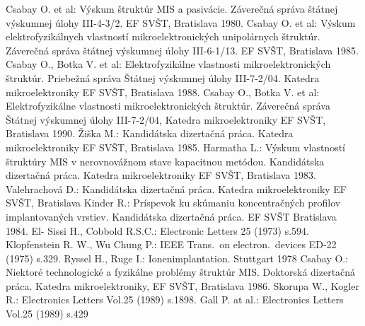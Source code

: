 \begin{thebibliography}{}
 Csabay O. et al: Výskum štruktúr MIS a
  pasivácie. Záverečná správa štátnej výskumnej úlohy III-4-3/2. EF
  SVŠT, Bratislava 1980.
 Csabay O. et al: Výskum elektrofyzikálnych
  vlastností mikroelektronických unipolárnych štruktúr. Záverečná
  správa štátnej výskumnej úlohy III-6-1/13. EF SVŠT, Bratislava 1985.
 Csabay O., Botka V. et al: Elektrofyzikálne
  vlastnosti mikroelektronických štruktúr. Priebežná správa Štátnej
  výskumnej úlohy III-7-2/04. Katedra mikroelektroniky EF SVŠT,
  Bratislava 1988.
 Csabay O., Botka V. et al: Elektrofyzikálne
  vlastnosti mikroelektronických štruktúr. Záverečná správa Štátnej
  výskumnej úlohy III-7-2/04, Katedra mikroelektroniky EF SVŠT,
  Bratislava 1990.
 Žiška M.: Kandidátska dizertačná práca. Katedra
  mikroelektroniky EF SVŠT, Bratislava 1985.
 Harmatha L.: Výskum vlastností štruktúry MIS v
  nerovnovážnom stave kapacitnou metódou. Kandidátska dizertačná
  práca. Katedra mikroelektroniky EF SVŠT, Bratislava 1983.
 Valehrachová D.: Kandidátska dizertačná
  práca. Katedra mikroelektroniky EF SVŠT, Bratislava
 Kinder R.: Príspevok ku skúmaniu koncentračných
  profilov implantovaných vrstiev. Kandidátska dizertačná práca. EF
  SVŠT Bratislava 1984.
El- Sissi H., Cobbold R.S.C.: Electronic Letters 25 (1973) s.594.
 Klopfenstein R. W., Wu Chung P.: IEEE Trans.\ on
  electron.\ devices ED-22 (1975) s.329.
Ryssel H., Ruge I.: Ionenimplantation. Stuttgart 1978
 Csabay O.: Niektoré technologické a fyzikálne
  problémy štruktúr MIS\@. Doktorská dizertačná práca. Katedra
  mikroelektroniky, EF SVŠT, Bratislava 1986.
Skorupa W., Kogler R.: Electronics Letters Vol.25 (1989) s.1898.
Gall P. at al.: Electronics Letters Vol.25 (1989) s.429
\end{thebibliography}
